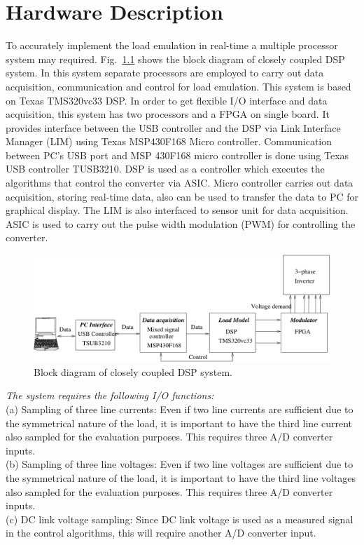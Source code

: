 \chapter{Hardware Description}
To accurately implement the  load emulation in real-time a multiple processor
system may required. Fig.~\ref{overall} shows the block diagram of closely coupled DSP system. In this system separate processors are employed to carry out data acquisition, communication and control for load emulation. This system is based on Texas TMS320vc33 DSP. In order to get flexible I/O interface and data acquisition, this system has two processors and a FPGA on single board. It provides interface between the USB controller and the DSP via Link Interface Manager (LIM) using Texas MSP430F168 Micro controller. Communication between PC's USB port and MSP 430F168 micro controller is done using Texas USB controller TUSB3210. DSP is used as a controller which executes the algorithms that control the converter via ASIC. Micro controller carries out data acquisition, storing real-time data, also  can  be used to transfer the data to PC for graphical display. The LIM is also interfaced to sensor unit for data acquisition.
ASIC is used to carry out the pulse width modulation (PWM) for controlling  the converter.\par
\begin{figure}[ht]
\centering
\includegraphics[width=6in]{overall.pdf}
\caption{Block diagram of closely coupled DSP system.}
\label{overall}
\end{figure}
\emph {The system requires the following I/O functions:}\\
(a) Sampling of three line currents: Even if two line currents are sufficient due to the symmetrical nature of the load, it is important to have the third line current also sampled for the evaluation purposes. This requires three A/D converter inputs.\\
(b) Sampling of three line voltages: Even if two line voltages are sufficient due to the symmetrical nature of the load, it is important to have the third line voltages also sampled for the evaluation purposes. This requires three A/D converter inputs.\\
(c) DC link voltage sampling: Since DC link voltage is used as a measured signal in the control algorithms, this will require another A/D converter input.
